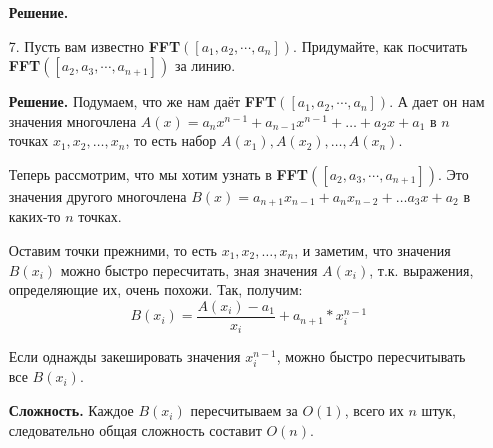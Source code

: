 \begin{enumerate}
	\textbf{Решение.}
	
	\item[7.] Пусть вам известно \textbf{FFT}$([a_1, a_2, \cdots , a_n])$. Придумайте, как пoсчитать 
	\textbf{FFT}$([a_2, a_3, \cdots , a_{n+1}])$ за линию.
	
	\textbf{Решение.} Подумаем, что же нам даёт \textbf{FFT}$([a_1, a_2, \cdots , a_n])$. А дает он нам значения 
	многочлена $A(x) = a_n x^{n - 1} + a_{n - 1} x^{n - 1} + \dots + a_2 x + a_1$ в $n$ точках $x_1, x_2, \dots, 
	x_n$, то есть набор $A(x_1), A(x_2), \dots, A(x_n)$.
	
	Теперь рассмотрим, что мы хотим узнать в \textbf{FFT}$([a_2, a_3, \cdots , a_{n+1}])$. Это значения другого 
	многочлена $B(x) = a_{n + 1} x_{n - 1} + a_n x_{n - 2} + \dots a_3 x + a_2$ в каких-то $n$ точках. 
	
	Оставим точки прежними, то есть  $x_1, x_2, \dots, x_n$, и заметим, что значения $B(x_i)$ можно быстро 
	пересчитать, зная значения $A(x_i)$, т.к. выражения, определяющие их, очень похожи. Так, получим:
	\begin{equation*}
		B(x_i) = \frac{A(x_i) - a_1}{x_i} + a_{n + 1} * x_i^{n - 1}
	\end{equation*}
	
	Если однажды закешировать значения $x_i^{n - 1}$, можно быстро пересчитывать все $B(x_i)$. 
	
	\textbf{Сложность.} Каждое $B(x_i)$ пересчитываем за $O(1)$, всего их $n$ штук, следовательно общая сложность 
	составит $O(n)$.
	
\end{enumerate}



